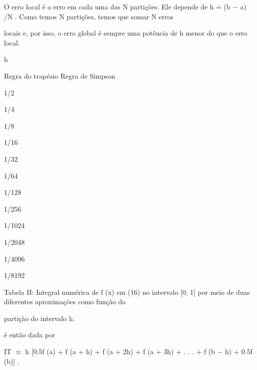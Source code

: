 \documentclass[a4paper,portrait,12pt]{article}
\begin{document}
\begin{flushleft}
O erro local \'{e} o erro em cada uma das N parti\c{c}\~{o}es. Ele depende de h = (b $-$ a) /N . Como temos N parti\c{c}\~{o}es, temos que somar N erros
\end{flushleft}


\begin{flushleft}
locais e, por isso, o erro global \'{e} sempre uma pot\^{e}ncia de h menor do que o erro local.
\end{flushleft}







\begin{flushleft}
h
\end{flushleft}





\begin{flushleft}
Regra do trap\'{e}zio Regra de Simpson
\end{flushleft}





1/2


1/4


1/8


1/16


1/32


1/64


1/128


1/256


1/1024


1/2048


1/4096


1/8192


\begin{flushleft}
Tabela II: Integral num\'{e}rica de f (x) em (16) no intervalo [0, 1] por meio de duas diferentes aproxima\c{c}\~{o}es como fun\c{c}\~{a}o da
\end{flushleft}


\begin{flushleft}
parti\c{c}\~{a}o do intervalo h.
\end{flushleft}





\begin{flushleft}
[a, b] \'{e} ent\~{a}o dada por
\end{flushleft}


\begin{flushleft}
IT $\approx$ h [0.5f (a) + f (a + h) + f (a + 2h) + f (a + 3h) + . . . + f (b $-$ h) + 0.5f (b)] .
\end{flushleft}
\end{document}
